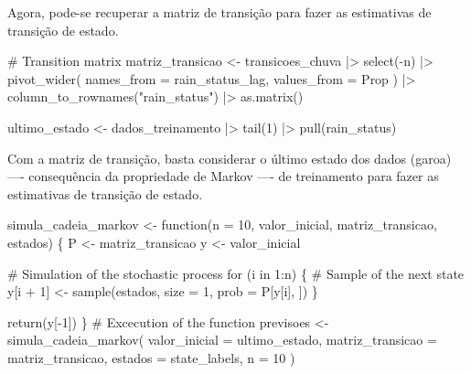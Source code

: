 \documentclass[
  letterpaper,
  DIV=11,
  numbers=noendperiod]{scrreprt}
\newenvironment{Shaded}{\begin{snugshade}}{\end{snugshade}}
\newcommand{\AttributeTok}[1]{\textcolor[rgb]{0.40,0.45,0.13}{#1}}
\newcommand{\CommentTok}[1]{\textcolor[rgb]{0.37,0.37,0.37}{#1}}
\newcommand{\ControlFlowTok}[1]{\textcolor[rgb]{0.00,0.23,0.31}{#1}}
\newcommand{\DecValTok}[1]{\textcolor[rgb]{0.68,0.00,0.00}{#1}}
\newcommand{\FunctionTok}[1]{\textcolor[rgb]{0.28,0.35,0.67}{#1}}
\newcommand{\NormalTok}[1]{\textcolor[rgb]{0.00,0.23,0.31}{#1}}
\newcommand{\OtherTok}[1]{\textcolor[rgb]{0.00,0.23,0.31}{#1}}
\newcommand{\SpecialCharTok}[1]{\textcolor[rgb]{0.37,0.37,0.37}{#1}}
\newcommand{\StringTok}[1]{\textcolor[rgb]{0.13,0.47,0.30}{#1}}
\begin{document}
Agora, pode-se recuperar a matriz de transição para fazer as estimativas
de transição de estado.

\begin{Shaded}
\begin{Highlighting}[]
\CommentTok{\# Transition matrix}
\NormalTok{matriz\_transicao }\OtherTok{\textless{}{-}}
\NormalTok{    transicoes\_chuva }\SpecialCharTok{|\textgreater{}}
    \FunctionTok{select}\NormalTok{(}\SpecialCharTok{{-}}\NormalTok{n) }\SpecialCharTok{|\textgreater{}}
    \FunctionTok{pivot\_wider}\NormalTok{(}
        \AttributeTok{names\_from =}\NormalTok{ rain\_status\_lag,}
        \AttributeTok{values\_from =}\NormalTok{ Prop}
\NormalTok{    ) }\SpecialCharTok{|\textgreater{}}
    \FunctionTok{column\_to\_rownames}\NormalTok{(}\StringTok{"rain\_status"}\NormalTok{) }\SpecialCharTok{|\textgreater{}}
    \FunctionTok{as.matrix}\NormalTok{()}

\NormalTok{ultimo\_estado }\OtherTok{\textless{}{-}}\NormalTok{ dados\_treinamento }\SpecialCharTok{|\textgreater{}}
    \FunctionTok{tail}\NormalTok{(}\DecValTok{1}\NormalTok{) }\SpecialCharTok{|\textgreater{}}
    \FunctionTok{pull}\NormalTok{(rain\_status)}
\end{Highlighting}
\end{Shaded}

Com a matriz de transição, basta considerar o último estado dos dados
(garoa) ---- consequência da propriedade de Markov ---- de treinamento
para fazer as estimativas de transição de estado.

\begin{Shaded}
\begin{Highlighting}[]
\NormalTok{simula\_cadeia\_markov }\OtherTok{\textless{}{-}} \ControlFlowTok{function}\NormalTok{(}\AttributeTok{n =} \DecValTok{10}\NormalTok{,}
\NormalTok{                                 valor\_inicial,}
\NormalTok{                                 matriz\_transicao,}
\NormalTok{                                 estados) \{}
\NormalTok{    P }\OtherTok{\textless{}{-}}\NormalTok{ matriz\_transicao}
\NormalTok{    y }\OtherTok{\textless{}{-}}\NormalTok{ valor\_inicial}

    \CommentTok{\# Simulation of the stochastic process}
    \ControlFlowTok{for}\NormalTok{ (i }\ControlFlowTok{in} \DecValTok{1}\SpecialCharTok{:}\NormalTok{n) \{}
        \CommentTok{\# Sample of the next state}
\NormalTok{        y[i }\SpecialCharTok{+} \DecValTok{1}\NormalTok{] }\OtherTok{\textless{}{-}} \FunctionTok{sample}\NormalTok{(estados, }\AttributeTok{size =} \DecValTok{1}\NormalTok{, }\AttributeTok{prob =}\NormalTok{ P[y[i], ])}
\NormalTok{    \}}

    \FunctionTok{return}\NormalTok{(y[}\SpecialCharTok{{-}}\DecValTok{1}\NormalTok{])}
\NormalTok{\}}
\CommentTok{\# Excecution of the function}
\NormalTok{previsoes }\OtherTok{\textless{}{-}} \FunctionTok{simula\_cadeia\_markov}\NormalTok{(}
    \AttributeTok{valor\_inicial =}\NormalTok{ ultimo\_estado,}
    \AttributeTok{matriz\_transicao =}\NormalTok{ matriz\_transicao,}
    \AttributeTok{estados =}\NormalTok{ state\_labels,}
    \AttributeTok{n =} \DecValTok{10}
\NormalTok{)}
\end{Highlighting}
\end{Shaded}
\end{document}
